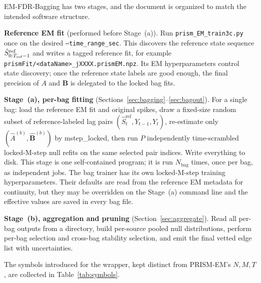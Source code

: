 \documentclass[11pt]{article}
\begin{document}
EM-FDR-Bagging has two stages, and the document is organized to match the
intended software structure.

\textbf{Reference EM fit} (performed before Stage~(a)). Run
\texttt{prism\_EM\_train3c.py} once on the desired \texttt{--time\_range\_sec}.
This discovers the reference state sequence
\(\hat S^{\text{ref}}_{0:T_{\rm ref}-1}\)
and writes a tagged reference fit, for example
\texttt{prismFit/<dataName>\_jXXXX.prismEM.npz}. Its EM hyperparameters
control state discovery; once the reference state labels are good enough, the
final precision of \(A\) and \(\mathbf B\) is delegated to the locked bag
fits.

\textbf{Stage~(a), per-bag fitting} (Sections~\ref{sec:bagging}--\ref{sec:bagout}).
For a single bag: load the reference EM fit and original spikes, draw a
fixed-size random subset of reference-labeled lag pairs
\((\hat S^{\text{ref}}_t,Y_{t-1},Y_t)\), re-estimate only
\((\hat A^{(b)},\hat{\mathbf B}^{(b)})\) by \textsf{mstep\_locked}, then run
\(P\) independently time-scrambled locked-M-step null refits on the same
selected pair indices. Write everything to disk. This stage is one
self-contained program; it is run \(N_{\text{bag}}\) times, once per bag, as
independent jobs. The bag trainer has its own locked-M-step training
hyperparameters. Their defaults are read from the reference EM metadata for
continuity, but they may be overridden on the Stage~(a) command line and the
effective values are saved in every bag file.

\textbf{Stage~(b), aggregation and pruning} (Section~\ref{sec:aggregate}).
Read all per-bag outputs from a directory, build per-source pooled null
distributions, perform per-bag selection and cross-bag stability selection,
and emit the final vetted edge list with uncertainties.

The symbols introduced for the wrapper, kept distinct from PRISM-EM's
\(N,M,T\), are collected in Table~\ref{tab:symbols}.
\end{document}
